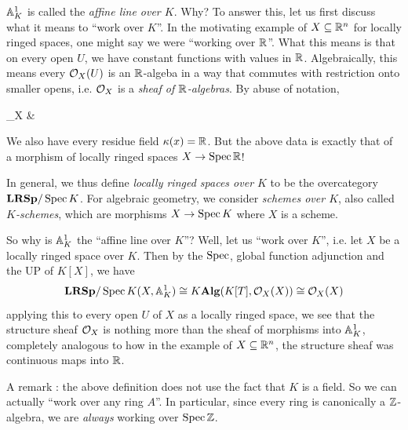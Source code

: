 \begin{eg}
  $\mathbb{A}^1_K$ is called the \emph{affine line over $K$}.
  Why? 
  To answer this, let us first discuss what it means to 
  ``work over $K$''.
  In the motivating example of $X \subseteq \mathbb{R}^n$ for locally ringed spaces,
  one might say we were ``working over $\mathbb{R}$''.
  What this means is that on every open $U$,
  we have constant functions with values in $\mathbb{R}$.
  Algebraically, this means every $\mathcal{O}_X(U)$ is an $\mathbb{R}$-algeba 
  in a way that commutes with restriction onto smaller opens,
  i.e. $\mathcal{O}_X$ is a \emph{sheaf of $\mathbb{R}$-algebras}.
  By abuse of notation, \begin{cd}
    \OO_X & \R \ar[l,hook']
  \end{cd}
  We also have every residue field $\kappa(x) = \mathbb{R}$.
  But the above data is exactly that of 
  a morphism of locally ringed spaces $X \to \operatorname{Spec} \mathbb{R}$!

  In general, 
  we thus define \emph{locally ringed spaces over $K$}
  to be the overcategory $\mathbf{LRSp}/\operatorname{Spec} K$.
  For algebraic geometry, 
  we consider \emph{schemes over $K$}, also called \emph{$K$-schemes},
  which are morphisms $X \to \operatorname{Spec} K$ where $X$ is a scheme.

  So why is $\mathbb{A}^1_K$ the ``affine line over $K$''?
  Well, let us ``work over $K$'',
  i.e. let $X$ be a locally ringed space over $K$.
  Then by the $\operatorname{Spec}$, global function adjunction 
  and the UP of $K[X]$,
  we have \[
    \mathbf{LRSp}/\operatorname{Spec} K(X, \mathbb{A}^1_K)
    \cong K\mathbf{Alg}(K[T], \mathcal{O}_X(X))
    \cong \mathcal{O}_X(X)
  \]
  applying this to every open $U$ of $X$ as a locally ringed space,
  we see that the structure sheaf $\mathcal{O}_X$
  is nothing more than the sheaf of morphisms into $\mathbb{A}^1_K$,
  completely analogous to how in the example of 
  $X \subseteq \mathbb{R}^n$, the structure sheaf was continuous maps into $\mathbb{R}$.
  
  A remark : the above definition does not use the fact that 
  $K$ is a field. 
  So we can actually ``work over any ring $A$''.
  In particular, 
  since every ring is canonically a $\mathbb{Z}$-algebra,
  we are \emph{always} working over $\operatorname{Spec} \mathbb{Z}$.

\end{eg}

